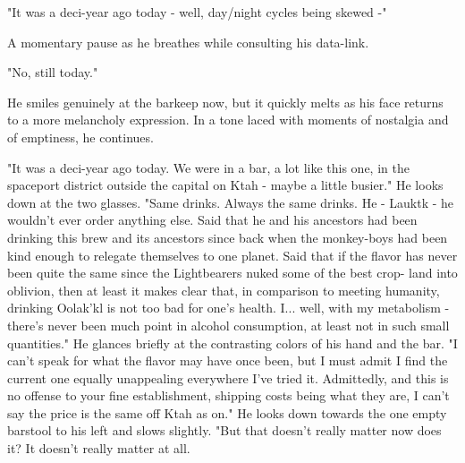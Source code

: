 "It was a deci-year ago today - well, day/night cycles being skewed -"

A momentary pause as he breathes while consulting his data-link.

"No, still today."

He smiles genuinely at the barkeep now, but it quickly melts as his
face returns to a more melancholy expression. In a tone laced with
moments of nostalgia and of emptiness, he continues.

"It was a deci-year ago today. We were in a bar, a lot like this one,
in the spaceport district outside the capital on Ktah - maybe a little
busier." He looks down at the two glasses. "Same drinks. Always the
same drinks. He - Lauktk - he wouldn't ever order anything else. Said
that he and his ancestors had been drinking this brew and its
ancestors since back when the monkey-boys had been kind enough to
relegate themselves to one planet. Said that if the flavor has never
been quite the same since the Lightbearers nuked some of the best
crop- land into oblivion, then at least it makes clear that, in
comparison to meeting humanity, drinking Oolak'kl is not too bad for
one's health. I... well, with my metabolism - there's never been much
point in alcohol consumption, at least not in such small quantities."
He glances briefly at the contrasting colors of his hand and the
bar. "I can't speak for what the flavor may have once been, but I must
admit I find the current one equally unappealing everywhere I've tried
it.  Admittedly, and this is no offense to your fine establishment,
shipping costs being what they are, I can't say the price is the same
off Ktah as on." He looks down towards the one empty barstool to his
left and slows slightly. "But that doesn't really matter now does it?
It doesn't really matter at all.

